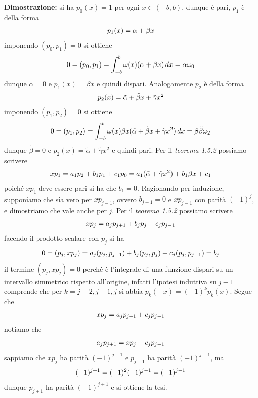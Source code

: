 \documentclass{article}
\begin{document}
\textbf{Dimostrazione:} si ha $p_0(x) = 1$ per ogni $x \in (-b, b)$, dunque è pari, $p_1$ è della forma
\begin{gather}
    p_1(x) = \alpha + \beta x \notag
\end{gather}
imponendo $(p_0, p_1) = 0$ si ottiene
\begin{gather}
    0 = (p_0, p_1) = \int_{-b}^b \omega(x)(\alpha + \beta x) \, dx = \alpha\omega_0 \notag
\end{gather}
dunque $\alpha = 0$ e $p_1(x) = \beta x$ e quindi dispari. Analogamente $p_2$ è della forma
\begin{gather}
    p_2(x) = \Tilde{\alpha} + \tilde{\beta} x + \tilde{\gamma} x^2 \notag
\end{gather}
imponendo $(p_1, p_2) = 0$ si ottiene
\begin{gather}
    0 = (p_1, p_2) = \int_{-b}^b \omega(x)\beta x(\tilde{\alpha} + \tilde{\beta}x + \tilde{\gamma}x^2) \, dx = \beta\tilde{\beta}\omega_2 \notag
\end{gather}
dunque $\tilde{\beta} = 0$ e $p_2(x) = \tilde{\alpha} + \tilde{\gamma}x^2$ e quindi pari. Per il \textit{teorema 1.5.2} possiamo scrivere
\begin{gather}
    xp_1 = a_1p_2 + b_1p_1 + c_1p_0 = a_1(\tilde{\alpha} + \tilde{\gamma}x^2) + b_1\beta x + c_1 \notag
\end{gather}
poiché $xp_1$ deve essere pari si ha che $b_1 = 0$. Ragionando per induzione, supponiamo che sia vero per $xp_{j-1}$, ovvero $b_{j-1} = 0$ e $xp_{j-1}$ con parità $(-1)^{j}$, e dimostriamo che vale anche per $j$. Per il \textit{teorema 1.5.2} possiamo scrivere
\begin{gather}
    xp_j = a_jp_{j+1} + b_jp_j + c_jp_{j-1} \notag
\end{gather}
facendo il prodotto scalare con $p_j$ si ha
\begin{gather}
    0 = (p_j, xp_j) = a_j(p_j, p_{j+1}) + b_j(p_j, p_j) + c_j(p_j, p_{j-1}) = b_j \notag
\end{gather}
il termine $(p_j, xp_j) = 0$ perché è l'integrale di una funzione dispari su un intervallo simmetrico rispetto all'origine, infatti l'ipotesi induttiva su $j-1$ comprende che per $k = j-2, j - 1, j$ si abbia $p_k(-x) = (-1)^kp_k(x)$. Segue che
\begin{gather}
    xp_j = a_jp_{j+1} + c_jp_{j-1} \notag
\end{gather}
notiamo che
\begin{gather}
    a_jp_{j+1} = xp_j - c_jp_{j-1} \notag
\end{gather}
sappiamo che $xp_j$ ha parità $(-1)^{j+1}$ e $p_{j-1}$ ha parità $(-1)^{j-1}$, ma
\begin{gather}
    (-1)^{j+1} = (-1)^2(-1)^{j-1} = (-1)^{j-1} \notag
\end{gather}
dunque $p_{j+1}$ ha parità $(-1)^{j+1}$ e si ottiene la tesi.
\end{document}
